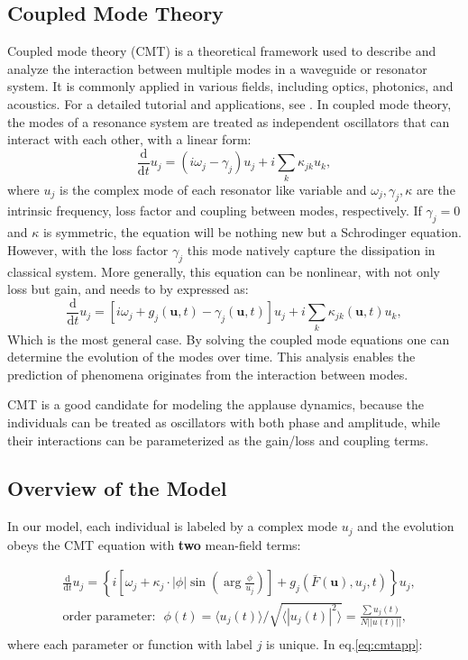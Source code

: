 \documentclass[UTF8,a4paper,11pt]{ctexart}
\begin{document}
\subsection{Coupled Mode Theory}
Coupled mode theory (CMT) is a theoretical framework used to describe and analyze the interaction between multiple modes in a waveguide or resonator system. It is commonly applied in various fields, including optics, photonics, and acoustics. For a detailed tutorial and applications, see \cite{CMT}. In coupled mode theory, the modes of a resonance system are treated as independent oscillators that can interact with each other, with a linear form:
\begin{equation}
    \frac{\mathrm{d}}{\mathrm{d} t} u_j = (iω_j-γ_j)u_j + i\sum_{k} κ_{jk}u_k,
\end{equation}
where $u_j$ is the complex mode of each resonator like variable and $ω_j,γ_j,κ$ are the intrinsic frequency, loss factor and coupling between modes, respectively. If $γ_j=0$ and $κ$ is symmetric, the equation will be nothing new but a Schrodinger equation. However, with the loss factor $γ_j$ this mode natively capture the dissipation in classical system. More generally, this equation can be nonlinear, with not only loss but gain, and needs to by expressed as:
\begin{equation}
    \frac{\mathrm{d}}{\mathrm{d} t} u_j = [iω_j + g_j(𝐮,t) - γ_j(𝐮,t)] u_j + i\sum_k κ_{jk}(𝐮,t)u_k,
\end{equation}
Which is the most general case. By solving the coupled mode equations one can determine the evolution of the modes over time. This analysis enables the prediction of phenomena originates from the interaction between modes.

CMT is a good candidate for modeling the applause dynamics, because the individuals can be treated as oscillators with both phase and amplitude, while their interactions can be parameterized as the gain/loss and coupling terms.

\subsection{Overview of the Model}

In our model, each individual is labeled by a complex mode $u_j$ and the evolution obeys the CMT equation with \textbf{two} mean-field terms:

\begin{equation}
    \begin{split}
        & \frac{\mathrm{d}}{\mathrm{d} t} u_j = \left\{ i \left[ ω_j + κ_j⋅|ϕ|\sin\left(\arg\frac{ϕ}{u_j}\right) \right] + g_j(\bar{F}(𝐮), u_j, t)  \right\} u_j,\\
        & \text{order parameter: }\,\, ϕ(t) = {⟨u_j(t)⟩}/{\sqrt{⟨|u_j(t)|^2⟩}} = \frac{\sum u_j(t) }{N||u(t)||},\\
    \end{split}
    \label{eq:cmtapp}
\end{equation}
where each parameter or function with label $j$ is unique. In eq.\ref{eq:cmtapp}:
\end{document}
